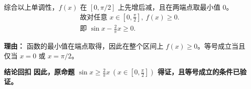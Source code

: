 \begin{proofbox}
\begin{description}[style=nextline, leftmargin=2.8em, labelsep=0.5em, itemsep=0.55em]
    \item[\textbf{步骤六（得出结论）：}] 综合以上单调性，$f(x)$ 在 $[0, \pi/2]$ 上先增后减，且在两端点取最小值 $0$。
    \[
    \begin{aligned}
        &\text{故对任意 } x \in [0, \tfrac{\pi}{2}],\ f(x) \geq 0. \\
        &\text{即 } \sin x - \frac{2}{\pi}x \geq 0.
    \end{aligned}
    \]
    \par\textbf{理由：} 函数的最小值在端点取得，因此在整个区间上 $f(x) \geq 0$。等号成立当且仅当 $x=0$ 或 $x=\pi/2$。
\end{description}

\medskip
\textbf{\textcolor{CProof}{结论回扣}}
\textbf{因此，原命题 $\sin x \geq \frac{2}{\pi}x \ (x \in [0,\frac{\pi}{2}])$ 得证，且等号成立的条件已验证。}
\end{proofbox}
